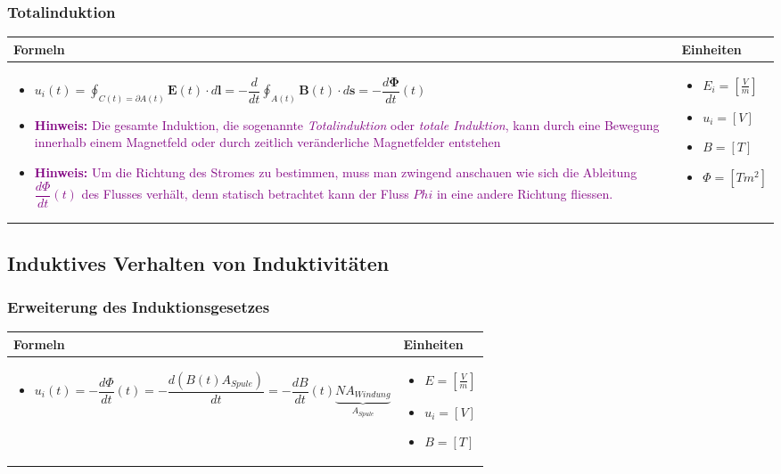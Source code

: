 \subsubsection{Totalinduktion}
\begin{tabular}{ | m{15cm} | m{3cm}  | }
	\hline
	Formeln & Einheiten \\ \hline
	\hline
	\begin{itemize}
		\item[] $u_i(t)=\displaystyle\oint_{C(t)=\partial A(t)}\mathbf{E}(t)\cdot d\mathbf{l}=-\dfrac{d}{dt}\displaystyle\oint_{A(t)}\mathbf{B}(t)\cdot d\mathbf{s}=-\dfrac{d\mathbf{\Phi}}{dt}(t)$
		\item[] \textcolor{purple}{\textbf{Hinweis:} Die gesamte Induktion, die sogenannte \emph{Totalinduktion} oder \emph{totale Induktion}, kann durch eine Bewegung innerhalb einem Magnetfeld oder durch zeitlich veränderliche Magnetfelder entstehen}
		\item[] \textcolor{purple}{\textbf{Hinweis:} Um die Richtung des Stromes zu bestimmen, muss man zwingend anschauen wie sich die Ableitung $\dfrac{d\Phi}{dt}(t)$ des Flusses verhält, denn statisch betrachtet kann der Fluss $Phi$ in eine andere Richtung fliessen.}
	\end{itemize} 
	&   	
	\begin{itemize}
		\item[] $E_i=[\frac{V}{m}]$
		\item[] $u_i=[V]$
		\item[] $B=[T]$
		\item[] $\Phi=[Tm^2]$
	\end{itemize} 
	\\ \hline
\end{tabular}

\subsection{Induktives Verhalten von Induktivitäten}
\subsubsection{Erweiterung des Induktionsgesetzes}
\begin{tabular}{ | m{15cm} | m{3cm}  | }
	\hline
	Formeln & Einheiten \\ \hline
	\hline
	\begin{itemize}
		\item[] $u_i(t)=-\dfrac{d\Phi}{dt}(t)=-\dfrac{d(B(t)A_{Spule})}{dt}=-\dfrac{dB}{dt}(t)\underbrace{NA_{Windung}}_{A_{Spule}}$
	\end{itemize} 
	&   	
	\begin{itemize}
		\item[] $E=[\frac{V}{m}]$
		\item[] $u_i=[V]$
		\item[] $B=[T]$
	\end{itemize} 
	\\ \hline
\end{tabular}


